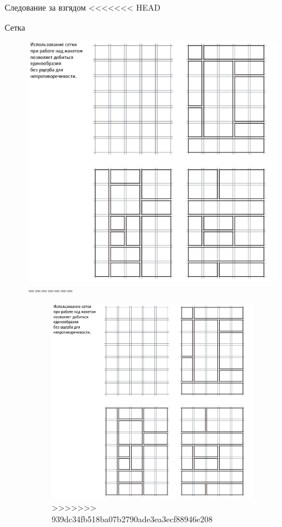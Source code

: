 \documentclass{beamer}
\begin{document}
\begin{frame}[t]{Следование за взгядом}
<<<<<<< HEAD
\begin{frame}[t]{Сетка}
	\begin{figure}[h]
		\centering
		\includegraphics[scale=0.4]{images/lec05-pic03.png}
=======
\begin{frame}[t]
	\begin{figure}[h]
		\centering
		\includegraphics[scale=0.5]{images/lec05-pic03.png}
>>>>>>> 939dc34fb518ba07b2790ade3ea3ecf88946e208
	\end{figure}
\end{frame}  


\end{figure}
\end{frame}
\end{frame}
\end{document}

